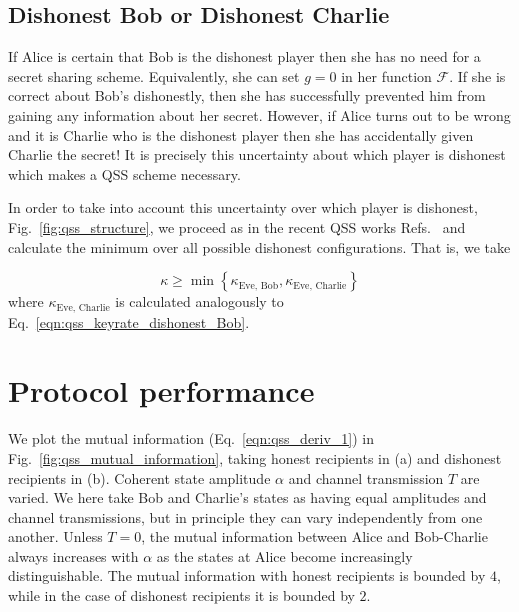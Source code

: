 

\subsection{Dishonest Bob or Dishonest Charlie}
If Alice is certain that Bob is the dishonest player then she has no need for a secret sharing scheme. Equivalently, she can set $g=0$ in her function $\mathcal{F}$. If she is correct about Bob's dishonestly, then she has successfully prevented him from gaining any information about her secret. However, if Alice turns out to be wrong and it is Charlie who is the dishonest player then she has accidentally given Charlie the secret! It is precisely this uncertainty about which player is dishonest which makes a QSS scheme necessary.

In order to take into account this uncertainty over which player is dishonest, Fig.~\ref{fig:qss_structure}, we proceed as in the recent QSS works Refs.~\cite{Kogias2017, Grice2019} and calculate the minimum over all possible dishonest configurations. That is, we take

\begin{equation}\label{eqn:qss_key_rate_min}
\kappa \ge \min \left\{\kappa_{\text{Eve, Bob}}, \kappa_{\text{Eve, Charlie}}\right\}
\end{equation}
where $\kappa_{\text{Eve, Charlie}}$ is calculated analogously to Eq.~\ref{eqn:qss_keyrate_dishonest_Bob}. 


\section{Protocol performance}\label{sec:qss_performance}


We plot the mutual information (Eq.~\ref{eqn:qss_deriv_1}) in Fig.~\ref{fig:qss_mutual_information}, taking honest recipients in (a) and dishonest recipients in (b). Coherent state amplitude $\alpha$ and channel transmission $T$ are varied. We here take Bob and Charlie's states as having equal amplitudes and channel transmissions, but in principle they can vary independently from one another. Unless $T=0$, the mutual information between Alice and Bob-Charlie always increases with $\alpha$ as the states at Alice become increasingly distinguishable. The mutual information with honest recipients is bounded by $4$, while in the case of dishonest recipients it is bounded by $2$. 


